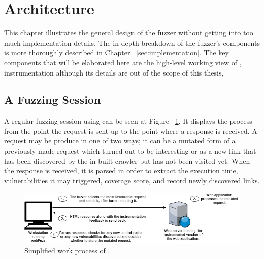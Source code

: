 \chapter{Architecture}
\label{sec:architecture}
\minitoc
\vspace*{1cm}

This chapter illustrates the general design of the fuzzer without getting into too much implementation details. The in-depth breakdown of the fuzzer's components is more thoroughly described in Chapter ~\ref{sec:implementation}. The key components that will be elaborated here are the high-level working view of \pname{}, instrumentation although its details are out of the scope of this thesis, 

\section{A Fuzzing Session}
A regular fuzzing session using \pname{} can be seen at Figure ~\ref{sec:architecture}. It displays the process from the point the request is sent up to the point where a response is received. A request may be produce in one of two ways; it can be a mutated form of a previously made request which turned out to be interesting or as a new link that has been discovered by the in-built crawler but has not been visited yet. When the response is received, it is parsed in order to extract the execution time, vulnerabilities it may triggered, coverage score, and record newly discovered links.


\begin{figure}[ht]
 \centering
 \captionsetup{justification=centering}
 \includegraphics[width=5.0in]{figures/architecture.png}
 \caption{Simplified work process of \pname{}.}
 \label{fig:architecture}
\end{figure}

